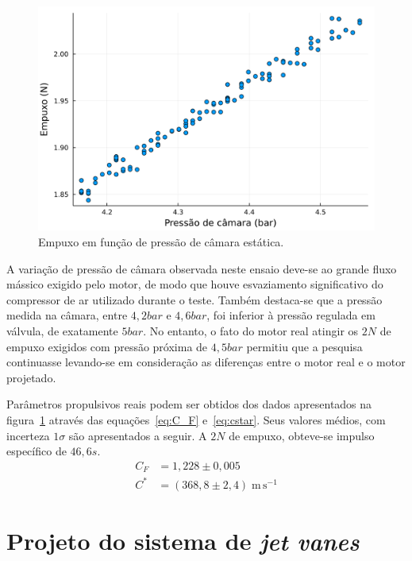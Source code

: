 \begin{figure}[htbp]
    \centering
    \includegraphics[width=\textwidth]{img/thrust_vs_chamber_pressure.png}
    \caption{Empuxo em função de pressão de câmara estática.}\label{fig:thrust_versus_p1}
\end{figure}

A variação de pressão de câmara observada neste ensaio deve-se ao grande fluxo mássico exigido pelo motor, de modo que houve esvaziamento significativo do compressor de ar utilizado durante o teste. Também destaca-se que a pressão medida na câmara, entre \(4,2bar\) e \(4,6bar\), foi inferior à pressão regulada em válvula, de exatamente \(5bar\). No entanto, o fato do motor real atingir os \(2N\) de empuxo exigidos com pressão próxima de \(4,5bar\) permitiu que a pesquisa continuasse levando-se em consideração as diferenças entre o motor real e o motor projetado.

Parâmetros propulsivos reais podem ser obtidos dos dados apresentados na figura~\ref{fig:thrust_versus_p1} através das equações~\ref{eq:C_F} e~\ref{eq:cstar}. Seus valores médios, com incerteza \(1\sigma \) são apresentados a seguir. A \(2N\) de empuxo, obteve-se impulso específico de \(46,6s\).
\begin{align}
    C_F &= 1,228 \pm 0,005 \\
    C^* &= (368,8 \pm 2,4)\;\mathrm{m}\,\mathrm{s}^{-1}
\end{align}

\section{Projeto do sistema de \textit{jet vanes}}\label{sec:result_jet_vanes}

